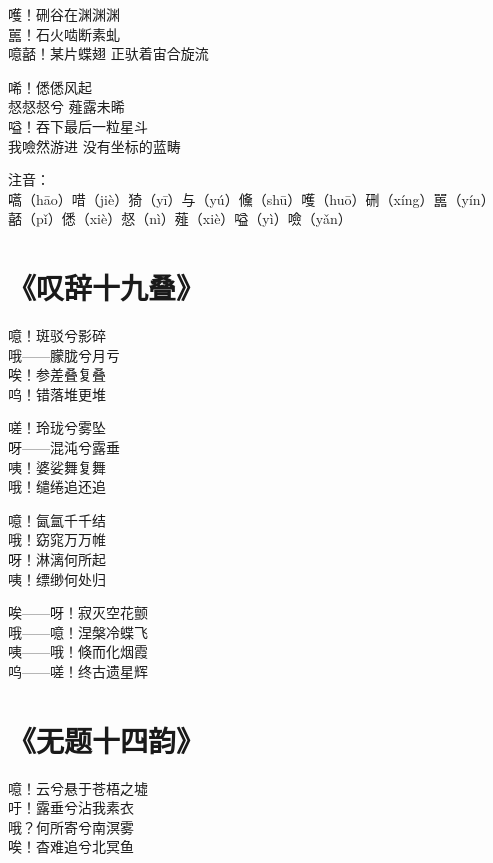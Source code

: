 嚄！硎谷在渊渊渊 \\
嚚！石火啮断素虬 \\
噫嚭！某片蝶翅 正驮着宙合旋流
\vspace{1em}

唏！僁僁风起 \\
惄惄惄兮 薤露未晞 \\
嗌！吞下最后一粒星斗 \\
我噞然游进 没有坐标的蓝畴
\vspace{1em}

注音： \\
嚆（hāo）唶（jiè）猗（yī）与（yú）儵（shū）嚄（huō）硎（xíng）嚚（yín） \\
嚭（pǐ）僁（xiè）惄（nì）薤（xiè）嗌（yì）噞（yǎn）

\clearpage


\section{《叹辞十九叠》}

噫！斑驳兮影碎 \\
哦——朦胧兮月亏 \\
唉！参差叠复叠 \\
呜！错落堆更堆
\vspace{1em}

嗟！玲珑兮雾坠 \\
呀——混沌兮露垂 \\
咦！婆娑舞复舞 \\
哦！缱绻追还追
\vspace{1em}

噫！氤氲千千结 \\
哦！窈窕万万帷 \\
呀！淋漓何所起 \\
咦！缥缈何处归
\vspace{1em}

唉——呀！寂灭空花颤 \\
哦——噫！涅槃冷蝶飞 \\
咦——哦！倏而化烟霞 \\
呜——嗟！终古遗星辉

\clearpage


\section{《无题十四韵》}

噫！云兮悬于苍梧之墟 \\
吁！露垂兮沾我素衣 \\
哦？何所寄兮南溟雾 \\
唉！杳难追兮北冥鱼
\vspace{1em}


